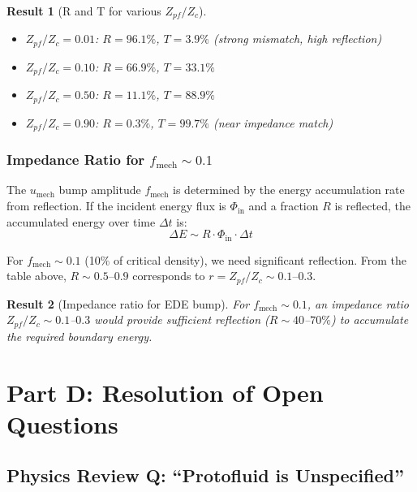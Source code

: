 \documentclass[11pt,a4paper]{article}
\newtheorem{result}{Result}
\begin{document}
\begin{result}[R and T for various $Z_{pf}/Z_c$]
\begin{itemize}
    \item $Z_{pf}/Z_c = 0.01$: $R = 96.1\%$, $T = 3.9\%$ (strong mismatch, high reflection)
    \item $Z_{pf}/Z_c = 0.10$: $R = 66.9\%$, $T = 33.1\%$
    \item $Z_{pf}/Z_c = 0.50$: $R = 11.1\%$, $T = 88.9\%$
    \item $Z_{pf}/Z_c = 0.90$: $R = 0.3\%$, $T = 99.7\%$ (near impedance match)
\end{itemize}
\end{result}

\subsubsection{Impedance Ratio for $f_{\mathrm{mech}} \sim 0.1$}

The $u_{\mathrm{mech}}$ bump amplitude $f_{\mathrm{mech}}$ is determined by the energy accumulation rate from reflection. If the incident energy flux is $\Phi_{\mathrm{in}}$ and a fraction $R$ is reflected, the accumulated energy over time $\Delta t$ is:
\begin{equation}
\Delta E \sim R \cdot \Phi_{\mathrm{in}} \cdot \Delta t
\end{equation}

For $f_{\mathrm{mech}} \sim 0.1$ (10\% of critical density), we need significant reflection. From the table above, $R \sim 0.5$--$0.9$ corresponds to $r = Z_{pf}/Z_c \sim 0.1$--$0.3$.

\begin{result}[Impedance ratio for EDE bump]
For $f_{\mathrm{mech}} \sim 0.1$, an impedance ratio $Z_{pf}/Z_c \sim 0.1$--$0.3$ would provide sufficient reflection ($R \sim 40$--$70\%$) to accumulate the required boundary energy.
\end{result}

\section{Part D: Resolution of Open Questions}
\label{sec:partD}

\subsection{Physics Review Q: ``Protofluid is Unspecified''}
\end{document}
